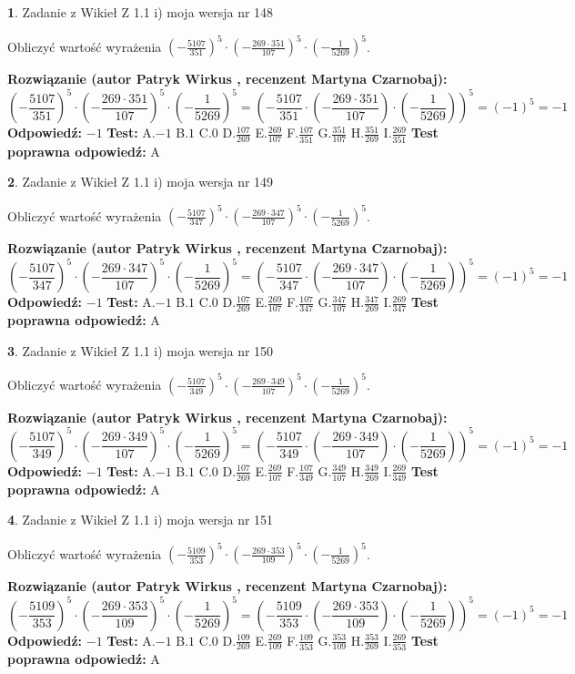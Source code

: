 \documentclass[12pt, a4paper]{article}
\theoremstyle{definition} %
\newtheorem{zad}{}
\newcommand{\zadStart}[1]{\begin{zad}#1\newline}
\newcommand{\zadStop}{\end{zad}}
\newcommand{\rozwStart}[2]{\noindent \textbf{Rozwiązanie (autor #1 , recenzent #2): }\newline}
\newcommand{\rozwStop}{\newline}
\newcommand{\odpStart}{\noindent \textbf{Odpowiedź:}\newline}
\newcommand{\odpStop}{\newline}
\newcommand{\testStart}{\noindent \textbf{Test:}\newline}
\newcommand{\testStop}{\newline}
\newcommand{\kluczStart}{\noindent \textbf{Test poprawna odpowiedź:}\newline}
\newcommand{\kluczStop}{\newline}
\begin{document}
\zadStart{Zadanie z Wikieł Z 1.1 i) moja wersja nr 148}

Obliczyć wartość wyrażenia $(-\frac{5107}{351})^{5} \cdot (-\frac{269 \cdot 351}{107})^{5} \cdot (-\frac{1}{5269})^{5}$.
\zadStop
\rozwStart{Patryk Wirkus}{Martyna Czarnobaj}
$$(-\frac{5107}{351})^{5} \cdot (-\frac{269 \cdot 351}{107})^{5} \cdot (-\frac{1}{5269})^{5} = (-\frac{5107}{351} \cdot (-\frac{269 \cdot 351}{107}) \cdot (-\frac{1}{5269}))^{5} = (-1)^{5} = -1$$
\rozwStop
\odpStart
$-1$
\odpStop
\testStart
A.$-1$ B.$1$ C.$0$ D.$\frac{107}{269}$ E.$\frac{269}{107}$
F.$\frac{107}{351}$ G.$\frac{351}{107}$
H.$\frac{351}{269}$
I.$\frac{269}{351}$
\testStop
\kluczStart
A
\kluczStop



\zadStart{Zadanie z Wikieł Z 1.1 i) moja wersja nr 149}

Obliczyć wartość wyrażenia $(-\frac{5107}{347})^{5} \cdot (-\frac{269 \cdot 347}{107})^{5} \cdot (-\frac{1}{5269})^{5}$.
\zadStop
\rozwStart{Patryk Wirkus}{Martyna Czarnobaj}
$$(-\frac{5107}{347})^{5} \cdot (-\frac{269 \cdot 347}{107})^{5} \cdot (-\frac{1}{5269})^{5} = (-\frac{5107}{347} \cdot (-\frac{269 \cdot 347}{107}) \cdot (-\frac{1}{5269}))^{5} = (-1)^{5} = -1$$
\rozwStop
\odpStart
$-1$
\odpStop
\testStart
A.$-1$ B.$1$ C.$0$ D.$\frac{107}{269}$ E.$\frac{269}{107}$
F.$\frac{107}{347}$ G.$\frac{347}{107}$
H.$\frac{347}{269}$
I.$\frac{269}{347}$
\testStop
\kluczStart
A
\kluczStop



\zadStart{Zadanie z Wikieł Z 1.1 i) moja wersja nr 150}

Obliczyć wartość wyrażenia $(-\frac{5107}{349})^{5} \cdot (-\frac{269 \cdot 349}{107})^{5} \cdot (-\frac{1}{5269})^{5}$.
\zadStop
\rozwStart{Patryk Wirkus}{Martyna Czarnobaj}
$$(-\frac{5107}{349})^{5} \cdot (-\frac{269 \cdot 349}{107})^{5} \cdot (-\frac{1}{5269})^{5} = (-\frac{5107}{349} \cdot (-\frac{269 \cdot 349}{107}) \cdot (-\frac{1}{5269}))^{5} = (-1)^{5} = -1$$
\rozwStop
\odpStart
$-1$
\odpStop
\testStart
A.$-1$ B.$1$ C.$0$ D.$\frac{107}{269}$ E.$\frac{269}{107}$
F.$\frac{107}{349}$ G.$\frac{349}{107}$
H.$\frac{349}{269}$
I.$\frac{269}{349}$
\testStop
\kluczStart
A
\kluczStop



\zadStart{Zadanie z Wikieł Z 1.1 i) moja wersja nr 151}

Obliczyć wartość wyrażenia $(-\frac{5109}{353})^{5} \cdot (-\frac{269 \cdot 353}{109})^{5} \cdot (-\frac{1}{5269})^{5}$.
\zadStop
\rozwStart{Patryk Wirkus}{Martyna Czarnobaj}
$$(-\frac{5109}{353})^{5} \cdot (-\frac{269 \cdot 353}{109})^{5} \cdot (-\frac{1}{5269})^{5} = (-\frac{5109}{353} \cdot (-\frac{269 \cdot 353}{109}) \cdot (-\frac{1}{5269}))^{5} = (-1)^{5} = -1$$
\rozwStop
\odpStart
$-1$
\odpStop
\testStart
A.$-1$ B.$1$ C.$0$ D.$\frac{109}{269}$ E.$\frac{269}{109}$
F.$\frac{109}{353}$ G.$\frac{353}{109}$
H.$\frac{353}{269}$
I.$\frac{269}{353}$
\testStop
\kluczStart
A
\kluczStop
\end{document}
